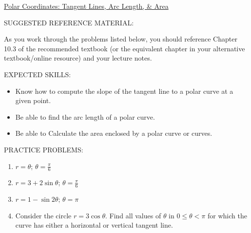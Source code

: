 \documentclass[12pt]{article}
\newif\ifans
\begin{document}
\begin{center}
\underline{\LARGE{Polar Coordinates: Tangent Lines, Arc Length, \& Area}}
\end{center}

\noindent SUGGESTED REFERENCE MATERIAL:

\bigskip

\noindent As you work through the problems listed below, you should reference Chapter 10.3 of the recommended textbook (or the equivalent chapter in your alternative textbook/online resource) and your lecture notes.

\bigskip

\noindent EXPECTED SKILLS:

\begin{itemize}

\item Know how to compute the slope of the tangent line to a polar curve at a given point. 

\item Be able to find the arc length of a polar curve.

\item Be able to Calculate the area enclosed by a polar curve or curves.

\end{itemize}

\noindent PRACTICE PROBLEMS:

\medskip


\begin{enumerate}

\item $r=\theta$; $\theta=\frac{\pi}{6}$ 

\ifans{\fbox{$\frac{\sqrt{3}\pi+6}{6\sqrt{3}-\pi}$}} \fi

\item $r=3+2\sin{\theta}$; $\theta=\frac{\pi}{6}$ 

\ifans{\fbox{$-5\sqrt{3}$; Detailed Solution: \textcolor{blue}{\href{http://www.math.drexel.edu/classes/Calculus/resources/Math122HW/Solutions/122_19_Polar_Calc_02.pdf}{Here}}}} \fi

\item $r=1-\sin{2\theta}$; $\theta = \pi$ 

\ifans{\fbox{$-\frac{1}{2}$}} \fi

\item Consider the circle $r=3\cos{\theta}$.  Find all values of $\theta$ in $0 \leq \theta < \pi$ for which the curve has either a horizontal or vertical tangent line.

\ifans{\fbox{\parbox{1\linewidth}{Vertical Tangent Lines when $\theta=0$ and $\theta=\frac{\pi}{2}$;\\ Horizontal Tangent Lines when $\theta=\frac{\pi}{4}$ or $\theta=\frac{3\pi}{4}$.}}} \fi

\end{enumerate}
\end{document}
